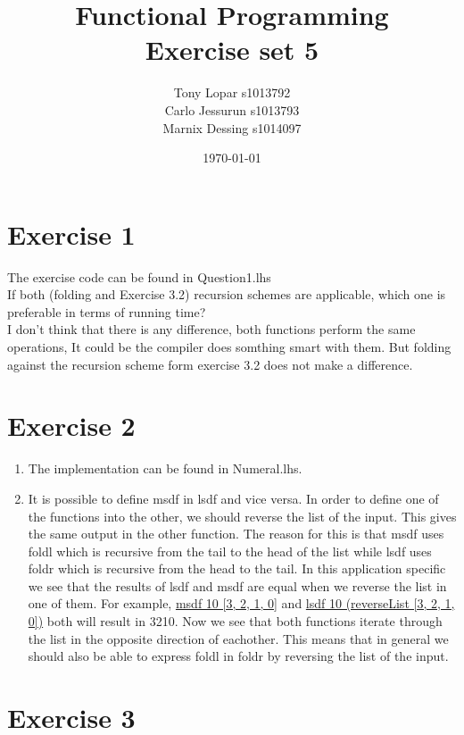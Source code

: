 \documentclass{article}
\begin{document}
\title{Functional Programming \\ Exercise set 5}
\date{\today}
\author{Tony Lopar s1013792 \\ Carlo Jessurun s1013793 \\ Marnix Dessing s1014097}
\maketitle

\section*{Exercise 1}
The exercise code can be found in Question1.lhs\\
If both (folding and Exercise 3.2) recursion schemes are applicable,
which one is preferable in terms of running time?\\
I don't think that there is any difference, both functions perform the same operations,
It could be the compiler does somthing smart with them. But folding against the
recursion scheme form exercise 3.2 does not make a difference.

\section*{Exercise 2}
\begin{enumerate}
  \item The implementation can be found in Numeral.lhs.
  \item It is possible to define msdf in lsdf and vice versa. In order to define one of the functions into the other, we should reverse the list of the input. This gives the same output in the other function. The reason for this is that msdf uses foldl which is recursive from the tail to the head of the list while lsdf uses foldr which is recursive from the head to the tail. In this application specific we see that the results of lsdf and msdf are equal when we reverse the list in one of them. For example, \underline{msdf 10 [3, 2, 1, 0]} and \underline{lsdf 10 (reverseList [3, 2, 1, 0])} both will result in 3210.
   Now we see that both functions iterate through the list in the opposite direction of eachother. This means that in general we should also be able to express foldl in foldr by reversing the list of the input.
\end{enumerate}
\section*{Exercise 3}
\end{document}
